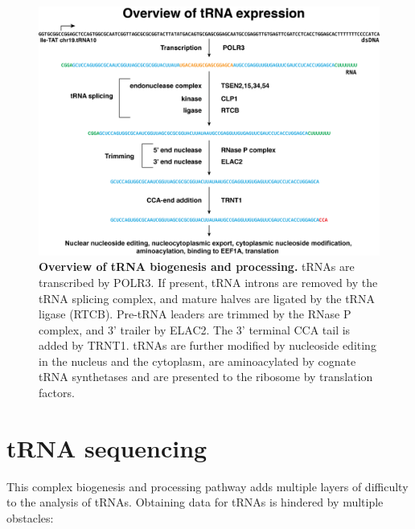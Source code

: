 \documentclass[12pt]{rockefeller}
\begin{document}
\begin{figure}[!ht]%
\centering
\includegraphics[width=\textwidth]{biogenesis2.png}%
\caption[tRNA biogensis]{\textbf{Overview of tRNA biogenesis and processing.} tRNAs are transcribed by POLR3. If present, tRNA introns are removed by the tRNA splicing complex, and mature halves are ligated by the tRNA ligase (RTCB). Pre-tRNA leaders are trimmed by the RNase P complex, and 3' trailer by ELAC2. The 3' terminal CCA tail is added by TRNT1. tRNAs are further modified by nucleoside editing in the nucleus and the cytoplasm, are aminoacylated by cognate tRNA synthetases and are presented to the ribosome by translation factors.}
\label{biogenesis}%
\end{figure}

\section{tRNA sequencing}
This complex biogenesis and processing pathway adds multiple layers of difficulty to the analysis of tRNAs. Obtaining  data for tRNAs is hindered by multiple obstacles:
\end{document}
